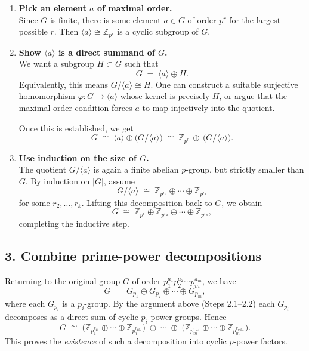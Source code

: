 \documentclass[12pt]{article}
\theoremstyle{definition} %
\theoremstyle{plain} %
\begin{document}
    \begin{enumerate}
    \item \textbf{Pick an element $a$ of maximal order.} \\
      Since $G$ is finite, there is some element $a \in G$ of order $p^r$ for the largest possible $r$.  
      Then $\langle a \rangle \cong \mathbb{Z}_{p^r}$ is a cyclic subgroup of $G$.
    
    \item \textbf{Show $\langle a \rangle$ is a direct summand of $G$.} \\
      We want a subgroup $H \subset G$ such that 
      \[
        G \;=\; \langle a \rangle \oplus H.
      \]
      Equivalently, this means $G / \langle a \rangle \cong H$.  
      One can construct a suitable surjective homomorphism $\varphi: G \to \langle a \rangle$ whose kernel is precisely $H$, or argue that the maximal order condition forces $a$ to map injectively into the quotient.
    
      Once this is established, we get
      \[
        G \;\cong\; \langle a \rangle \oplus \bigl(G / \langle a \rangle \bigr)
        \;\cong\;
        \mathbb{Z}_{p^r} \,\oplus\, \bigl(G / \langle a \rangle \bigr).
      \]
    
    \item \textbf{Use induction on the size of $G$.} \\
      The quotient $G / \langle a \rangle$ is again a finite abelian $p$-group, but strictly smaller than $G$.  
      By induction on $|G|$, assume
      \[
        G / \langle a \rangle \;\cong\; \mathbb{Z}_{p^{r_2}} \oplus \cdots \oplus \mathbb{Z}_{p^{r_k}}
      \]
      for some $r_2, \dots, r_k$.  
      Lifting this decomposition back to $G$, we obtain
      \[
        G \;\cong\; \mathbb{Z}_{p^r} \oplus \mathbb{Z}_{p^{r_2}} \oplus \cdots \oplus \mathbb{Z}_{p^{r_k}},
      \]
      completing the inductive step.
    \end{enumerate}
    
    \subsection*{3. Combine prime-power decompositions}
    
    Returning to the original group $G$ of order $p_1^{a_1} p_2^{a_2} \cdots p_m^{a_m}$, we have
    \[
      G \;=\; G_{p_1} \oplus G_{p_2} \oplus \cdots \oplus G_{p_m},
    \]
    where each $G_{p_i}$ is a $p_i$-group.  
    By the argument above (Steps 2.1--2.2) each $G_{p_i}$ decomposes as a direct sum of cyclic $p_i$-power groups.  
    Hence
    \[
      G \;\cong\; 
       \bigl(\mathbb{Z}_{p_1^{r_{11}}} \oplus \cdots \oplus \mathbb{Z}_{p_1^{r_{1k_1}}}\bigr)
       \;\oplus\;\cdots\;\oplus\;
       \bigl(\mathbb{Z}_{p_m^{r_{m1}}} \oplus \cdots \oplus \mathbb{Z}_{p_m^{r_{mk_m}}}\bigr).
    \]
    This proves the \emph{existence} of such a decomposition into cyclic $p$-power factors.
    
\end{document}
